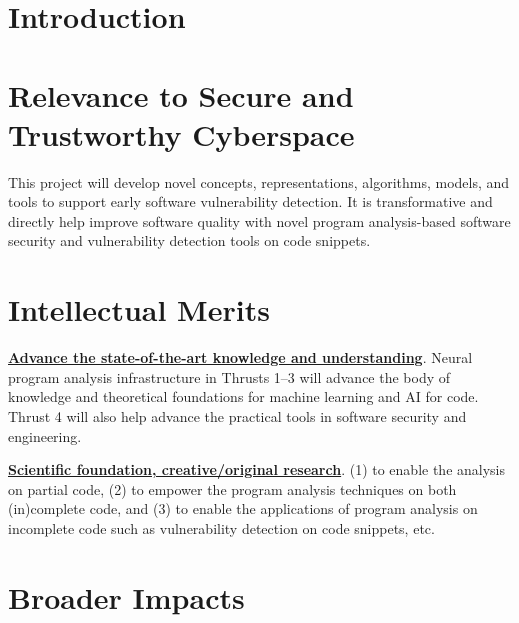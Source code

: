 \section{Introduction}\label{sec:intro}



%





\section{Relevance to Secure and Trustworthy Cyberspace}

This project will develop novel concepts, representations, algorithms,
models, and tools to support early software vulnerability
detection. It is transformative and directly help improve software
quality with novel program analysis-based software security and
vulnerability detection tools on code snippets.

\section{Intellectual Merits}


\noindent \underline{{\bf Advance the state-of-the-art knowledge and
    understanding}}. Neural program analysis infrastructure in Thrusts
1--3 will advance the body of knowledge and theoretical foundations
for machine learning and AI for code. Thrust 4 will also help advance the
practical tools in software security and engineering.

\noindent \underline{{\bf Scientific foundation, creative/original
    research}}. (1) to enable the analysis on partial code, (2) to empower
the program analysis techniques on both (in)complete code,
and (3) to enable the applications of program analysis on incomplete
code such as vulnerability detection on code snippets, etc.

\section{Broader Impacts}

